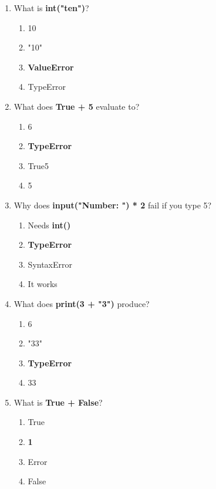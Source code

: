 \documentclass{article}
\begin{document}
\begin{multicols*}{4}
\begin{enumerate}
        \item What is \textbf{int("ten")}?
        \begin{enumerate}[label=(\Alph*)]
            \item 10
            \item "10"
            \item \textbf{ValueError}
            \item TypeError
        \end{enumerate}

        \item What does \textbf{True + 5} evaluate to?
        \begin{enumerate}[label=(\Alph*)]
            \item 6
            \item \textbf{TypeError}
            \item True5
            \item 5
        \end{enumerate}

        \item Why does \textbf{input("Number: ") * 2} fail if you type 5?
        \begin{enumerate}[label=(\Alph*)]
            \item Needs \textbf{int()}
            \item \textbf{TypeError}
            \item SyntaxError
            \item It works
        \end{enumerate}
        \item What does \textbf{print(3 + "3")} produce?
        \begin{enumerate}[label=(\Alph*)]
            \item 6
            \item "33"
            \item \textbf{TypeError}
            \item 33
        \end{enumerate}

        \item What is \textbf{True + False}?
        \begin{enumerate}[label=(\Alph*)]
            \item True
            \item \textbf{1}
            \item Error
            \item False
        \end{enumerate}


\end{enumerate}
\end{multicols*}
\end{document}
